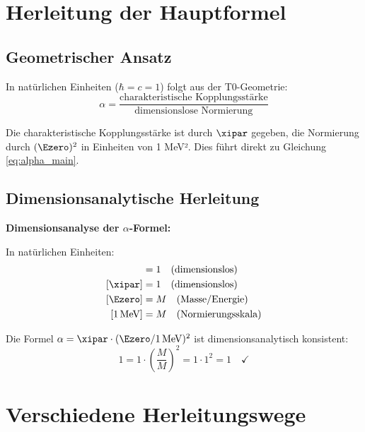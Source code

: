 	\section{Herleitung der Hauptformel}
	
	\subsection{Geometrischer Ansatz}
	
	In natürlichen Einheiten ($\hbar = c = 1$) folgt aus der T0-Geometrie:
	\begin{equation}
		\alpha = \frac{\text{charakteristische Kopplungsstärke}}{\text{dimensionslose Normierung}}
		\label{eq:alpha_geometric}
	\end{equation}
	
	Die charakteristische Kopplungsstärke ist durch $\xipar$ gegeben, die Normierung durch $(\Ezero)^2$ in Einheiten von 1 MeV². Dies führt direkt zu Gleichung \eqref{eq:alpha_main}.
	
	\subsection{Dimensionsanalytische Herleitung}
	
	\begin{foundation}
		\textbf{Dimensionsanalyse der $\alpha$-Formel:}
		
		In natürlichen Einheiten:
		\begin{align}
			[\alpha] &= 1 \quad \text{(dimensionslos)}\\
			[\xipar] &= 1 \quad \text{(dimensionslos)}\\
			[\Ezero] &= M \quad \text{(Masse/Energie)}\\
			[1\,\text{MeV}] &= M \quad \text{(Normierungsskala)}
		\end{align}
		
		Die Formel $\alpha = \xipar \cdot (\Ezero/1\,\text{MeV})^2$ ist dimensionsanalytisch konsistent:
		\begin{equation}
			1 = 1 \cdot \left(\frac{M}{M}\right)^2 = 1 \cdot 1^2 = 1 \quad \checkmark
		\end{equation}
	\end{foundation}
	
	\section{Verschiedene Herleitungswege}
	
